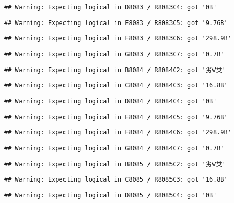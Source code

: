 \documentclass[
]{article}
\begin{document}
\begin{verbatim}
## Warning: Expecting logical in D8083 / R8083C4: got '0B'
\end{verbatim}

\begin{verbatim}
## Warning: Expecting logical in E8083 / R8083C5: got '9.76B'
\end{verbatim}

\begin{verbatim}
## Warning: Expecting logical in F8083 / R8083C6: got '298.9B'
\end{verbatim}

\begin{verbatim}
## Warning: Expecting logical in G8083 / R8083C7: got '0.7B'
\end{verbatim}

\begin{verbatim}
## Warning: Expecting logical in B8084 / R8084C2: got '劣Ⅴ类'
\end{verbatim}

\begin{verbatim}
## Warning: Expecting logical in C8084 / R8084C3: got '16.8B'
\end{verbatim}

\begin{verbatim}
## Warning: Expecting logical in D8084 / R8084C4: got '0B'
\end{verbatim}

\begin{verbatim}
## Warning: Expecting logical in E8084 / R8084C5: got '9.76B'
\end{verbatim}

\begin{verbatim}
## Warning: Expecting logical in F8084 / R8084C6: got '298.9B'
\end{verbatim}

\begin{verbatim}
## Warning: Expecting logical in G8084 / R8084C7: got '0.7B'
\end{verbatim}

\begin{verbatim}
## Warning: Expecting logical in B8085 / R8085C2: got '劣Ⅴ类'
\end{verbatim}

\begin{verbatim}
## Warning: Expecting logical in C8085 / R8085C3: got '16.8B'
\end{verbatim}

\begin{verbatim}
## Warning: Expecting logical in D8085 / R8085C4: got '0B'
\end{verbatim}
\end{document}

